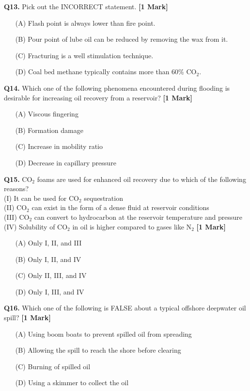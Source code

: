 \documentclass[11pt]{article}
\newcommand{\questiona}[2]{
    \noindent\textbf{Q#2.} #1 \hfill \textbf{[1 Mark]}
}
\begin{document}
\questiona{Pick out the INCORRECT statement.}{13}
\begin{enumerate}
    \item[(A)] Flash point is always lower than fire point.  
    \item[(B)] Pour point of lube oil can be reduced by removing the wax from it.  
    \item[(C)] Fracturing is a well stimulation technique.  
    \item[(D)] Coal bed methane typically contains more than 60\% CO\(_2\).  
\end{enumerate}
\vspace{0.5cm}

\questiona{Which one of the following phenomena encountered during flooding is desirable for increasing oil recovery from a reservoir?}{14}
\begin{enumerate}
    \item[(A)] Viscous fingering  
    \item[(B)] Formation damage  
    \item[(C)] Increase in mobility ratio  
    \item[(D)] Decrease in capillary pressure  
\end{enumerate}
\vspace{0.5cm}

\questiona{CO\(_2\) foams are used for enhanced oil recovery due to which of the following reasons? \\ 
(I) It can be used for CO\(_2\) sequestration \\
(II) CO\(_2\) can exist in the form of a dense fluid at reservoir conditions \\
(III) CO\(_2\) can convert to hydrocarbon at the reservoir temperature and pressure \\
(IV) Solubility of CO\(_2\) in oil is higher compared to gases like N\(_2\)}{15}
\begin{enumerate}
    \item[(A)] Only I, II, and III  
    \item[(B)] Only I, II, and IV  
    \item[(C)] Only II, III, and IV  
    \item[(D)] Only I, III, and IV  
\end{enumerate}
\vspace{0.5cm}

\questiona{Which one of the following is FALSE about a typical offshore deepwater oil spill?}{16}
\begin{enumerate}
    \item[(A)] Using boom boats to prevent spilled oil from spreading  
    \item[(B)] Allowing the spill to reach the shore before clearing  
    \item[(C)] Burning of spilled oil  
    \item[(D)] Using a skimmer to collect the oil  
\end{enumerate}
\vspace{0.5cm}
\end{document}
